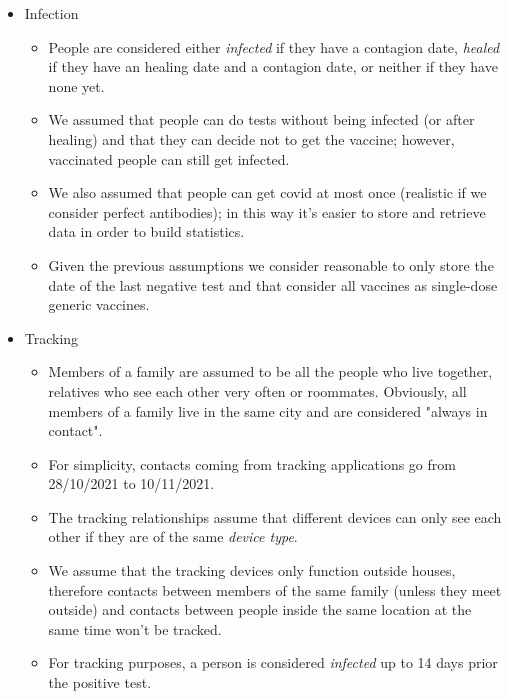 \documentclass[12pt, a4paper]{article}
\begin{document}
\begin{itemize}

    \item Infection
    \begin{itemize}
        \item[] People are considered either \emph{infected} if they have a 
            contagion date, \emph{healed} if they have an healing date and a 
            contagion date, or neither if they have none yet.
        \item[] We assumed that people can do tests without being infected 
            (or after healing) and that they can decide not to get the vaccine;
            however, vaccinated people can still get infected.
        \item[] We also assumed that people can get covid at most once 
            (realistic if we consider perfect antibodies); in this way it's 
            easier to store and retrieve data in order to build statistics.
        \item[] Given the previous assumptions we consider reasonable to only
            store the date of the last negative test and that consider all 
            vaccines as single-dose generic vaccines.
    \end{itemize}

    \item Tracking
    \begin{itemize}
        \item[] Members of a family are assumed to be all the people who live 
            together, relatives who see each other very often or roommates. 
            Obviously, all members of a family live in the same city and are 
            considered "always in contact".
	\item[] For simplicity, contacts coming from tracking applications
	 go from 28/10/2021 to 10/11/2021.
        \item[] The tracking relationships assume that different devices can 
            only see each other if they are of the same \emph{device type}.
        \item[] We assume that the tracking devices only function outside 
            houses, therefore contacts between members of the same family 
            (unless they meet outside) and contacts between people inside the
            same location at the same time won't be tracked.
        \item[] For tracking purposes, a person is considered \emph{infected}
            up to 14 days prior the positive test. 
    \end{itemize}


\end{itemize}
\end{document}
